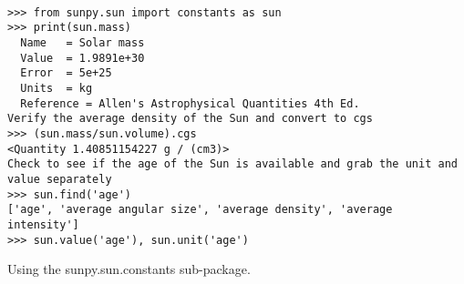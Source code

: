 \begin{listing}[H]
\begin{verbatim}

>>> from sunpy.sun import constants as sun
>>> print(sun.mass)
  Name   = Solar mass
  Value  = 1.9891e+30
  Error  = 5e+25
  Units  = kg
  Reference = Allen's Astrophysical Quantities 4th Ed.
Verify the average density of the Sun and convert to cgs
>>> (sun.mass/sun.volume).cgs
<Quantity 1.40851154227 g / (cm3)>
Check to see if the age of the Sun is available and grab the unit and value separately
>>> sun.find('age')
['age', 'average angular size', 'average density', 'average intensity']
>>> sun.value('age'), sun.unit('age')

\end{verbatim}
\caption{Using the sunpy.sun.constants sub-package.}
\label{code:constants_code}
\end{listing}
	

